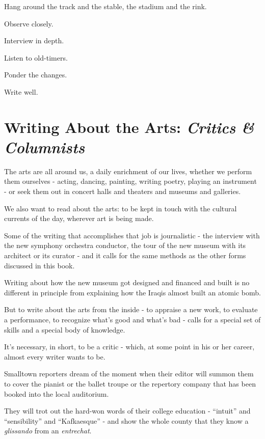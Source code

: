 \documentclass{book}
\numberwithin{equation}{section}
\begin{document}
%
Hang around the track and the stable, the stadium and the rink.

Observe closely.

Interview in depth.

Listen to old-timers.

Ponder the changes.

Write well.


\chapter{Writing About the Arts: \textit{Critics \& Columnists}}

The arts are all around us, a daily enrichment of our lives, whether we perform them ourselves - acting, dancing, painting, writing poetry, playing an instrument - or seek them out in concert halls and theaters and museums and galleries.

We also want to read about the arts: to be kept in touch with the cultural currents of the day, wherever art is being made.

%
Some of the writing that accomplishes that job is journalistic - the interview with the new symphony orchestra conductor, the tour of the new museum with its architect or its curator - and it calls for the same methods as the other forms discussed in this book.

Writing about how the new museum got designed and financed and built is no different in principle from explaining how the Iraqis almost built an atomic bomb.

%
But to write about the arts from the inside - to appraise a new work, to evaluate a performance, to recognize what's good and what's bad - calls for a special set of skills and a special body of knowledge.

It's necessary, in short, to be a critic - which, at some point in his or her career, almost every writer wants to be.

Smalltown reporters dream of the moment when their editor will summon them to cover the pianist or the ballet troupe or the repertory company that has been booked into the local auditorium.

They will trot out the hard-won words of their college education - ``intuit'' and ``sensibility'' and ``Kafkaesque'' - and show the whole county that they know a \textit{glissando} from an \textit{entrechat}.
\end{document}
